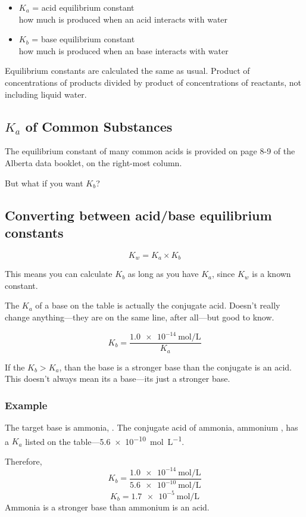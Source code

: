 \documentclass[a4paper,12pt]{article}
\begin{document}
\begin{itemize}
    \item{$K_a$ = acid equilibrium constant \\ how much  is produced when an acid interacts with water}
    \item{$K_b$ = base equilibrium constant \\ how much  is produced when an base interacts with water}
\end{itemize}

Equilibrium constants are calculated the same as usual. Product of concentrations of products divided by product of concentrations of reactants, not including liquid water.

\subsection{$K_a$ of Common Substances}
The equilibrium constant of many common acids is provided on page 8-9 of the Alberta data booklet, on the right-most column.

But what if you want $K_b$?

\subsection{Converting between acid/base equilibrium constants}
\Large
$$K_w = K_a \times K_b$$
\normalsize

This means you can calculate $K_b$ as long as you have $K_a$, since $K_w$ is a known constant.

The $K_a$ of a base on the table is actually the conjugate acid. Doesn't really change anything---they are on the same line, after all---but good to know.

\Large
$$K_b = \frac{\SI{1.0e-14}{\mol\per\L}}{K_a}$$
\normalsize

If the $K_b > K_a$, than the base is a stronger base than the conjugate is an acid. This doesn't always mean its a base---its just a stronger base.

\subsubsection{Example}
The target base is ammonia, . The conjugate acid of ammonia, ammonium , has a $K_a$ listed on the table---\SI{5.6e-10}{\mol\per\L}.

Therefore,
$$K_b = \frac{\SI{1.0e-14}{\mol\per\L}}{\SI{5.6e-10}{\mol\per\L}}$$
$$K_b = \SI{1.7e-5}{\mol\per\L}$$
Ammonia  is a stronger base than ammonium  is an acid.
\end{document}
